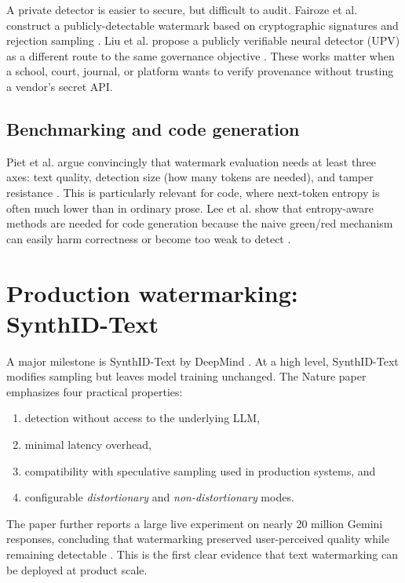 \documentclass[11pt]{article}
\theoremstyle{definition}
\newcommand{\1}{\mathbf{1}}
\begin{document}
A private detector is easier to secure, but difficult to audit. Fairoze et al. construct a publicly-detectable watermark based on cryptographic signatures and rejection sampling \cite{fairoze2024public}. Liu et al. propose a publicly verifiable neural detector (UPV) as a different route to the same governance objective \cite{liu2024upv}. These works matter when a school, court, journal, or platform wants to verify provenance without trusting a vendor's secret API.

\subsection{Benchmarking and code generation}

Piet et al. argue convincingly that watermark evaluation needs at least three axes: text quality, detection size (how many tokens are needed), and tamper resistance \cite{piet2023markmywords}. This is particularly relevant for code, where next-token entropy is often much lower than in ordinary prose. Lee et al. show that entropy-aware methods are needed for code generation because the naive green/red mechanism can easily harm correctness or become too weak to detect \cite{lee2024code}.

\section{Production watermarking: SynthID-Text}

A major milestone is SynthID-Text by DeepMind \cite{dathathri2024synthid,deepmind2024blog}. At a high level, SynthID-Text modifies sampling but leaves model training unchanged. The Nature paper emphasizes four practical properties:
\begin{enumerate}
    \item detection without access to the underlying LLM,
    \item minimal latency overhead,
    \item compatibility with speculative sampling used in production systems, and
    \item configurable \emph{distortionary} and \emph{non-distortionary} modes.
\end{enumerate}
The paper further reports a large live experiment on nearly 20 million Gemini responses, concluding that watermarking preserved user-perceived quality while remaining detectable \cite{dathathri2024synthid}. This is the first clear evidence that text watermarking can be deployed at product scale.
\end{document}
